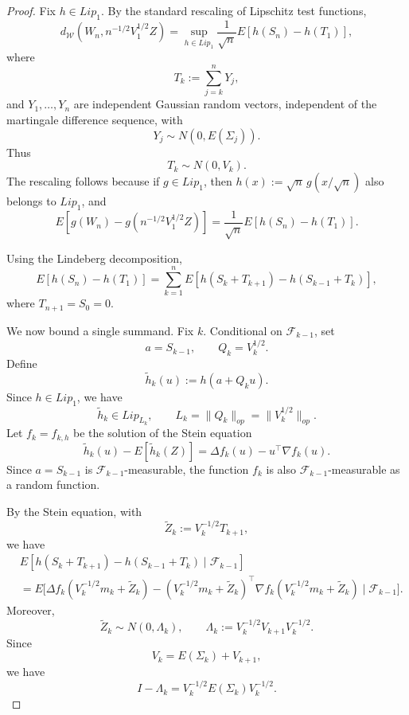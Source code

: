 \documentclass[10pt,a4paper]{amsart}
\begin{document}
\begin{proof}
Fix \(h\in Lip_1\). By the standard rescaling of Lipschitz test functions,
\[
d_{\mathcal W}(W_n,n^{-1/2}V_1^{1/2}Z)
=
\sup_{h\in Lip_1}
\frac{1}{\sqrt n}
E\left[h(S_n)-h(T_1)\right],
\]
where
\[
    T_k:=\sum_{j=k}^n Y_j,
\]
and \(Y_1,\ldots,Y_n\) are independent Gaussian random vectors, independent
of the martingale difference sequence, with
\[
    Y_j\sim N(0,E(\Sigma_j)).
\]
Thus
\[
    T_k\sim N(0,V_k).
\]
The rescaling follows because if \(g\in Lip_1\), then
\(h(x):=\sqrt n\,g(x/\sqrt n)\) also belongs to \(Lip_1\), and
\[
E\left[g(W_n)-g(n^{-1/2}V_1^{1/2}Z)\right]
=
\frac{1}{\sqrt n}
E\left[h(S_n)-h(T_1)\right].
\]

Using the Lindeberg decomposition,
\[
E\left[h(S_n)-h(T_1)\right]
=
\sum_{k=1}^n
E\left[
h(S_k+T_{k+1})-h(S_{k-1}+T_k)
\right],
\]
where \(T_{n+1}=S_0=0\).

We now bound a single summand. Fix \(k\). Conditional on
\(\mathcal F_{k-1}\), set
\[
    a=S_{k-1},
    \qquad
    Q_k=V_k^{1/2}.
\]
Define
\[
    \widetilde h_k(u):=h(a+Q_k u).
\]
Since \(h\in Lip_1\), we have
\[
    \widetilde h_k\in Lip_{L_k},
    \qquad
    L_k=\|Q_k\|_{op}=\|V_k^{1/2}\|_{op}.
\]
Let \(f_k=f_{k,h}\) be the solution of the Stein equation
\[
    \widetilde h_k(u)-E[\widetilde h_k(Z)]
    =
    \Delta f_k(u)-u^\top\nabla f_k(u).
\]
Since \(a=S_{k-1}\) is \(\mathcal F_{k-1}\)-measurable, the function
\(f_k\) is also \(\mathcal F_{k-1}\)-measurable as a random function.

By the Stein equation, with
\[
    \widetilde Z_k:=V_k^{-1/2}T_{k+1},
\]
we have
\begin{align*}
& E\left[
h(S_k+T_{k+1})-h(S_{k-1}+T_k)
\mid
\mathcal F_{k-1}
\right]
\\
&=
E\biggl[
\Delta f_k\left(V_k^{-1/2}m_k+\widetilde Z_k\right)
-
\left(V_k^{-1/2}m_k+\widetilde Z_k\right)^\top
\nabla f_k\left(V_k^{-1/2}m_k+\widetilde Z_k\right)
\mid
\mathcal F_{k-1}
\biggr].
\end{align*}
Moreover,
\[
    \widetilde Z_k
    \sim
    N(0,\Lambda_k),
    \qquad
    \Lambda_k:=V_k^{-1/2}V_{k+1}V_k^{-1/2}.
\]
Since
\[
    V_k=E(\Sigma_k)+V_{k+1},
\]
we have
\[
    I-\Lambda_k
    =
    V_k^{-1/2}E(\Sigma_k)V_k^{-1/2}.
\]


\end{proof}
\end{document}
